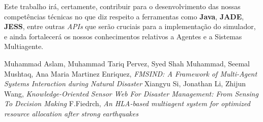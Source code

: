 \documentclass[a4paper]{article}
\begin{document}
Este trabalho irá, certamente, contribuir para o desenvolvimento das nossas competências técnicas no que diz respeito a ferramentas como \textbf{Java}, \textbf{JADE}, \textbf{JESS}, entre outras \textit{APIs} que serão cruciais para a implementação do simulador, e ainda fortalecerá os nossos conhecimentos relativos a Agentes e a Sistemas Multiagente.\newpage

\begin{thebibliography}{}
Muhammad Aslam, Muhammad Tariq Pervez, Syed Shah Muhammad, Seemal Mushtaq, Ana Maria Martinez Enriquez,
\textit{FMSIND: A Framework of Multi-Agent Systems Interaction during Natural Disaster}
Xiangyu Si, Jonathan Li, Zhijun Wang, 
\textit{Knowledge-Oriented Sensor Web For Disaster Management: From Sensing To Decision Making}
F.Fiedrch, 
\textit{
An HLA-based multiagent system for optimized resource allocation after strong earthquakes
}
\end{thebibliography}{}
\end{document}
